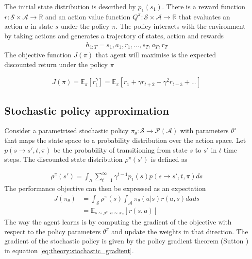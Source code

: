 \documentclass[class=book, crop=false]{standalone}
\begin{document}
The initial state distribution is described by $p_{1}(s_{1})$. There is a reward function $r: \mathcal{S} \times \mathcal{A} \to \mathbb{R}$ and an action value function $Q^{\pi}:\mathcal{S} \times \mathcal{A} \to \mathbb{R}$ that evaluates an action $a$ in state $s$ under the policy $\pi$. The policy interacts with the environment by taking actions and generates a trajectory of states, action and rewards 
\begin{equation}
   \begin{aligned}\label{eq:theory:trajectory2}
h_{1:T} = s_{1},a_{1},r_{1},..., s_{T},a_{T},r_{T}
\end{aligned} 
\end{equation}
The objective function $J(\pi)$ that agent will maximise is the expected discounted return under the policy $\pi$

\begin{equation}
   \begin{aligned}\label{eq:theory:max_discounted_return}
J(\pi)
= \mathbb{E}_{\pi}[r^{\gamma}_{1}]
= \mathbb{E}_{\pi}[ r_{1} + \gamma r_{t+2} + \gamma^{2} r_{t+3} + ...]
\end{aligned} 
\end{equation}

\subsection{Stochastic policy approximation}\label{section:stochastic_policy_approx}
Consider a parametrised stochastic policy $\pi_{\theta}: \mathcal{S}\to \mathcal{P}(\mathcal{A})$ with parameters $\theta^{\pi}$ that maps the state space to a probability distribution over the action space. Let $p(s\to s',t,\pi)$ be the probability of transitioning from state $s$ to $s'$ in $t$ time steps. The discounted state distribution $\rho^{\pi}(s')$ is defined as   

\begin{equation}
   \begin{aligned}\label{eq:theory:discounted_state_distribution}
    \rho^{\pi}(s') = \int_{\mathcal{S}}\sum_{t=1}^{\infty }\gamma^{t-1}p_{1}(s)
    p(s \to s',t,\pi)ds
\end{aligned} 
\end{equation}
The performance objective can then be expressed as an expectation
\begin{equation}
   \begin{aligned}\label{eq:theory:objective_expected_stochastic}
    J(\pi_{\theta}) &= 
    \int_{\mathcal{S}}\rho^{\pi}(s) \int_{\mathcal{A}}\pi_{\theta}(a|s)r(a,s)da ds 
    \\
    &=
    \mathbb{E}_{s\sim \rho^{\pi},a \sim \pi_{\theta}}[r(s,a)]
\end{aligned} 
\end{equation}
 The way the agent learns is by computing the gradient of the objective with respect to the policy parameters $\theta^{\pi}$ and update the weights in that direction. The gradient of the stochastic policy is given by the policy gradient theorem (Sutton \cite{Sutton1998}) in equation \eqref{eq:theory:stochastic_gradient}.
\end{document}
